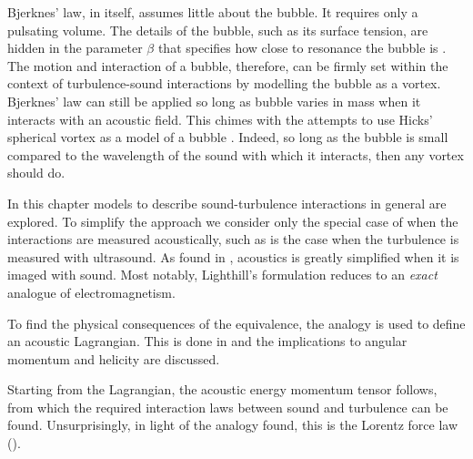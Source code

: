 Bjerknes' law, in itself, assumes little about the bubble. 
It requires only a pulsating volume.
The details of the bubble, such as its surface tension, are hidden in the parameter $\beta$ that specifies how close to resonance the bubble is \cite{Leighton1990}.
The motion and interaction of a bubble, therefore, 
can be firmly set within the context of turbulence-sound interactions by modelling the bubble as a vortex.
Bjerknes' law can still be applied so long as bubble varies in mass when it interacts with an acoustic field.
This chimes with the attempts to use Hicks'  spherical vortex as a model of a bubble \cite{Levine1959}.
Indeed, so long as the bubble is small compared 
to the wavelength of the sound with which it interacts, then any vortex should do.


In this chapter %
models to describe sound-turbulence interactions in general are explored.
To simplify the approach we consider only the special case of when the interactions are measured acoustically,
such as is the case when the turbulence is measured with ultrasound.
As found in , acoustics is greatly 
simplified when it is imaged with sound.
Most notably, Lighthill's formulation reduces to an {\em exact} analogue of electromagnetism.

To find the physical consequences of the equivalence,
the analogy is used to define an acoustic Lagrangian.
This is done in  and the implications to angular momentum and helicity are discussed.

Starting from the Lagrangian, the acoustic energy momentum tensor follows,
from which the required interaction laws between sound and turbulence can be found.
Unsurprisingly, in light of the analogy found, 
this is the Lorentz force law  ().

